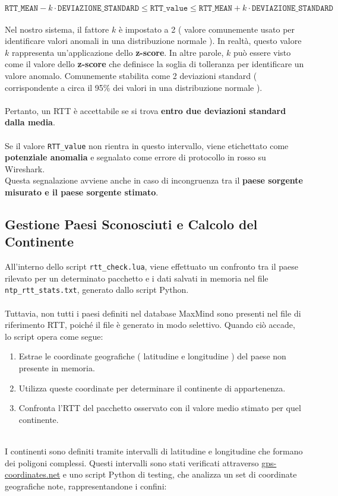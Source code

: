 \begin{equation} 
\texttt{RTT\_MEAN} - k \cdot \texttt{DEVIAZIONE\_STANDARD} \leq \texttt{RTT\_value} \leq \texttt{RTT\_MEAN} + k \cdot \texttt{DEVIAZIONE\_STANDARD} 
\end{equation} 
\\
Nel nostro sistema, il fattore \( k \) è impostato a 2 ( valore comunemente usato per identificare valori anomali in una distribuzione normale ). In realtà, questo valore \( k \) rappresenta un'applicazione dello \textbf{z-score}. In altre parole, \( k \) può essere visto come il valore dello \textbf{z-score} che definisce la soglia di tolleranza per identificare un valore anomalo. Comunemente stabilita come 2 deviazioni standard ( corrispondente a circa il 95\% dei valori in una distribuzione normale ).\\
\\
Pertanto, un RTT è accettabile se si trova \textbf{entro due deviazioni standard dalla media}.\\
\\ 
Se il valore \texttt{RTT\_value} non rientra in questo intervallo, viene etichettato come \textbf{potenziale anomalia} e segnalato come errore di protocollo in rosso su Wireshark.
\\
Questa segnalazione avviene anche in caso di incongruenza tra il \textbf{paese sorgente misurato e il paese sorgente stimato}.

\subsection{Gestione Paesi Sconosciuti e Calcolo del Continente}

All'interno dello script \texttt{rtt\_check.lua}, viene effettuato un confronto tra il paese rilevato per un determinato pacchetto e i dati salvati in memoria nel file \texttt{ntp\_rtt\_stats.txt}, generato dallo script Python.\\
\\
Tuttavia, non tutti i paesi definiti nel database MaxMind sono presenti nel file di riferimento RTT, poiché il file è generato in modo selettivo. Quando ciò accade, lo script opera come segue:

\begin{enumerate}
  \item Estrae le coordinate geografiche ( latitudine e longitudine ) del paese non presente in memoria.
  \item Utilizza queste coordinate per determinare il continente di appartenenza.
  \item Confronta l'RTT del pacchetto osservato con il valore medio stimato per quel continente.
\end{enumerate}
\\
I continenti sono definiti tramite intervalli di latitudine e longitudine che formano dei poligoni complessi. Questi intervalli sono stati verificati attraverso \href{https://www.gps-coordinates.net/}{gps-coordinates.net} e uno script Python di testing, che analizza un set di coordinate geografiche note, rappresentandone i confini:


